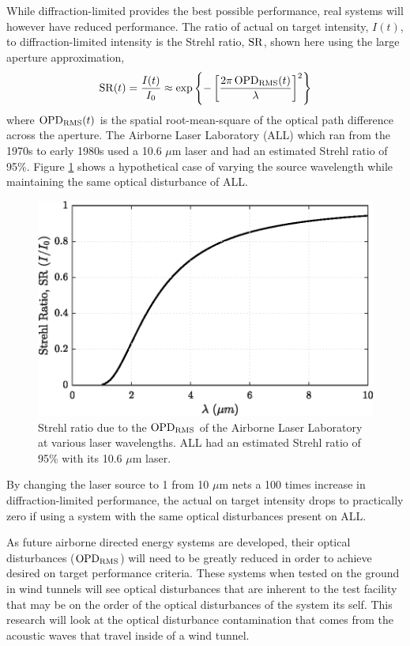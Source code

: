 While diffraction-limited provides the best possible performance, real systems will however have reduced performance.
The ratio of actual on target intensity, $I(t)$, to diffraction-limited intensity is the Strehl ratio, $\operatorname{SR}$, shown here using the large aperture approximation,
\begin{equation}
  \operatorname{SR}(t) = \frac{I(t)}{I_0} \approx \exp\left\{-\left[\frac{2\pi \operatorname{OPD_{RMS}}(t)}{\lambda}\right]^2\right\}
  \label{eqn:01_strehl_ratio}
\end{equation}
where $\operatorname{OPD_{RMS}}(t)$ is the spatial root-mean-square of the optical path difference across the aperture.
The Airborne Laser Laboratory (ALL) which ran from the 1970s to early 1980s used a 10.6 $\mu$m laser and had an estimated Strehl ratio of 95\%\cite{Jumper-2013-8KtN3pue}.
Figure \ref{fig:01_strehl_ratio} shows a hypothetical case of varying the source wavelength while maintaining the same optical disturbance of ALL.
\begin{figure}
  \centering
  \includegraphics{../matlab/01_introduction/strehl_ratio.eps}
  \caption{Strehl ratio due to the $\operatorname{OPD_{RMS}}$ of the Airborne Laser Laboratory at various laser wavelengths.  ALL had an estimated Strehl ratio of 95\% with its 10.6 $\mu$m laser.}
  \label{fig:01_strehl_ratio}
\end{figure}
By changing the laser source to 1 from 10 $\mu$m nets a 100 times increase in diffraction-limited performance, the actual on target intensity drops to practically zero if using a system with the same optical disturbances present on ALL.

As future airborne directed energy systems are developed, their optical disturbances ($\operatorname{OPD_{RMS}}$) will need to be greatly reduced in order to achieve desired on target performance criteria.
These systems when tested on the ground in wind tunnels will see optical disturbances that are inherent to the test facility that may be on the order of the optical disturbances of the system its self.
This research will look at the optical disturbance contamination that comes from the acoustic waves that travel inside of a wind tunnel.

